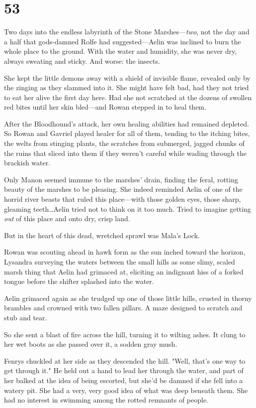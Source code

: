
\chapter{53}

Two days into the endless labyrinth of the Stone Marshes---\emph{two}, not the day and a half that gods-damned Rolfe had suggested---Aelin was inclined to burn the whole place to the ground.
With the water and humidity, she was never dry, always sweating and sticky.
And worse: the insects.

She kept the little demons away with a shield of invisible flame, revealed only by the zinging as they slammed into it.
She might have felt bad, had they not tried to eat her alive the first day here.
Had she not scratched at the dozens of swollen red bites until her skin bled---and Rowan stepped in to heal them.

After the Bloodhound's attack, her own healing abilities had remained depleted.
So Rowan and Gavriel played healer for all of them, tending to the itching bites, the welts from stinging plants, the scratches from submerged, jagged chunks of the ruins that sliced into them if they weren't careful while wading through the brackish water.

Only Manon seemed immune to the marshes' drain, finding the feral, rotting beauty of the marshes to be pleasing.
She indeed reminded Aelin of one of the horrid river beasts that ruled this place---with those golden eyes, those sharp, gleaming teeth\ldots Aelin tried not to think on it too much.
Tried to imagine getting \emph{out} of this place and onto dry, crisp land.

But in the heart of this dead, wretched sprawl was Mala's Lock.

Rowan was scouting ahead in hawk form as the sun inched toward the horizon, Lysandra surveying the waters between the small hills as some slimy, scaled marsh thing that Aelin had grimaced at, eliciting an indignant hiss of a forked tongue before the shifter splashed into the water.

Aelin grimaced again as she trudged up one of those little hills, crusted in thorny brambles and crowned with two fallen pillars.
A maze designed to scratch and stub and tear.

So she sent a blast of fire across the hill, turning it to wilting ashes.
It clung to her wet boots as she passed over it, a sodden gray mush.

Fenrys chuckled at her side as they descended the hill.
"Well, that's one way to get through it."
He held out a hand to lead her through the water, and part of her balked at the idea of being escorted, but  she'd be damned if she fell into a watery pit.
She had a very, very good idea of what was deep beneath them.
She had no interest in swimming among the rotted remnants of people.


